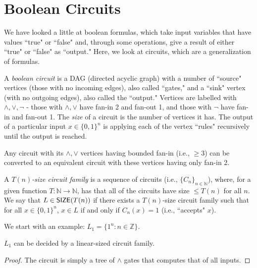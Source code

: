 \section{Boolean Circuits}

We have looked a little at boolean formulas, which take input variables that have values ``true" or ``false" and, through some operations, give a result of either ``true" or ``false" as ``output." Here, we look at circuits, which are a generalization of formulas.

\begin{definition}
A \emph{boolean circuit} is a DAG (directed acyclic graph) with a number of ``source" vertices (those with no incoming edges), also called ``gates," and a ``sink" vertex (with no outgoing edges), also called the ``output." Vertices are labelled with $\wedge, \vee, \neg$ - those with $\wedge, \vee$ have fan-in 2 and fan-out 1, and those with $\neg$ have fan-in and fan-out 1. The \emph{size} of a circuit is the number of vertices it has. The output of a particular input $x \in \{0, 1\}^n$ is applying each of the vertex ``rules" recursively until the output is reached. 
\end{definition}

\begin{theorem}
Any circuit with its $\wedge, \vee$ vertices having bounded fan-in (i.e., $\ge 3$) can be converted to an equivalent circuit with these vertices having only fan-in 2. 
\end{theorem}

\begin{definition}
A \emph{$T(n)$-size circuit family} is a sequence of circuits (i.e., $\{C_n\}_{n \in \mathbb{N}}$), where, for a given function $T \colon \mathbb{N} \rightarrow \mathbb{N}$, has that all of the circuits have size $\le T(n)$ for all $n$. We say that $L \in {\ensuremath{\mathsf{SIZE}}}(T(n))$ if there exists a $T(n)$-size circuit family such that for all $x \in \{0, 1\}^n$, $x \in L$ if and only if $C_n(x) = 1$ (i.e., ``accepts" $x$). 
\end{definition}

We start with an example: $L_1 = \{1^n \colon n \in \mathbb{Z}\}$.
\begin{theorem}
\label{thm:unary_linear_circuit_family}
$L_1$ can be decided by a linear-sized circuit family. 
\end{theorem}

\begin{proof}
The circuit is simply a tree of $\wedge$ gates that computes that of all inputs. 
\end{proof}

